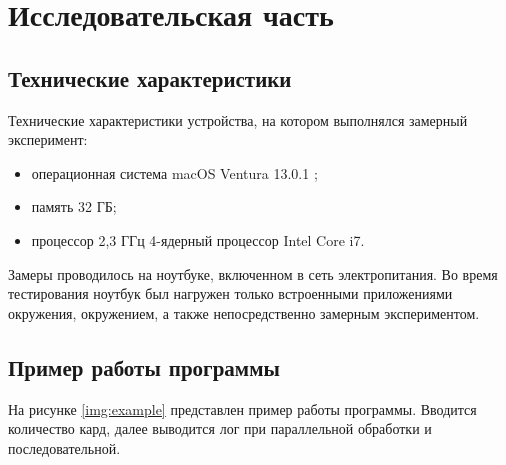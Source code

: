 \section{Исследовательская часть}

\subsection{Технические характеристики}

Технические характеристики устройства, на котором выполнялся замерный эксперимент:
\begin{itemize}[label*=---]
	\item операционная система macOS  Ventura 13.0.1 \cite{ventura};
	\item память 32 ГБ;
	\item процессор 2,3 ГГц 4-ядерный процессор Intel Core i7.
\end{itemize}

Замеры проводилось на ноутбуке, включенном в сеть электропитания. Во время тестирования ноутбук был нагружен только встроенными приложениями окружения, окружением, а также непосредственно замерным экспериментом.

\subsection{Пример работы программы}

На рисунке \ref{img:example} представлен пример работы программы. Вводится количество кард, далее выводится лог при параллельной обработки и последовательной. 

